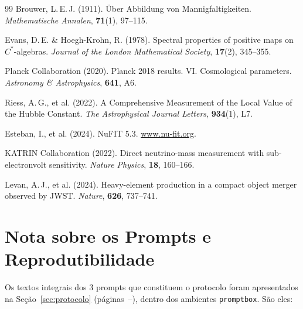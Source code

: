 \documentclass[12pt, a4paper]{article}
\theoremstyle{tglstyle}
\theoremstyle{definition}
\begin{document}
\begin{thebibliography}{99}
Brouwer, L.\,E.\,J. (1911).
\"Uber Abbildung von Mannigfaltigkeiten.
\textit{Mathematische Annalen}, \textbf{71}(1), 97--115.

Evans, D.\,E. \& Hoegh-Krohn, R. (1978).
Spectral properties of positive maps on $C^*$-algebras.
\textit{Journal of the London Mathematical Society}, \textbf{17}(2), 345--355.

Planck Collaboration (2020).
Planck 2018 results. VI. Cosmological parameters.
\textit{Astronomy \& Astrophysics}, \textbf{641}, A6.

Riess, A.\,G., et al. (2022).
A Comprehensive Measurement of the Local Value of the Hubble Constant.
\textit{The Astrophysical Journal Letters}, \textbf{934}(1), L7.

Esteban, I., et al. (2024).
NuFIT 5.3.
\href{http://www.nu-fit.org}{www.nu-fit.org}.

KATRIN Collaboration (2022).
Direct neutrino-mass measurement with sub-electronvolt sensitivity.
\textit{Nature Physics}, \textbf{18}, 160--166.

Levan, A.\,J., et al. (2024).
Heavy-element production in a compact object merger observed by JWST.
\textit{Nature}, \textbf{626}, 737--741.

\end{thebibliography}


\newpage
\appendix
\section{Nota sobre os Prompts e Reprodutibilidade}\label{sec:apendice_prompts}

Os textos integrais dos 3 prompts que constituem o protocolo foram apresentados na Seção~\ref{sec:protocolo} (páginas~\pageref{sec:prompt1}--\pageref{sec:prompt3}), dentro dos ambientes \texttt{promptbox}. São eles:
\end{document}
